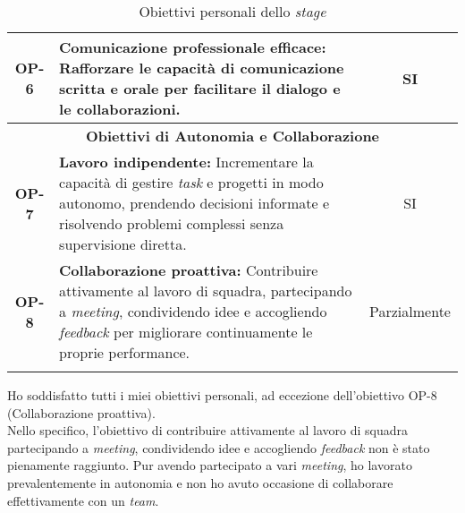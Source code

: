 \begin{longtable}{|c|>{\centering\arraybackslash}p{}|c|}
    \hline
    \textbf{OP-6} & \textbf{Comunicazione professionale efficace:} Rafforzare le capacità di comunicazione scritta e orale per facilitare il dialogo e le collaborazioni.& SI \\
    \hline
    \multicolumn{3}{|c|}{\rowcolor{green!30} \textbf{Obiettivi di Autonomia e Collaborazione}} \\
    \hline
    \textbf{OP-7} & \textbf{Lavoro indipendente:} Incrementare la capacità di gestire \textit{task} e progetti in modo autonomo, prendendo decisioni informate e risolvendo problemi complessi senza supervisione diretta.& SI \\
    \hline
    \textbf{OP-8} & \textbf{Collaborazione proattiva:} Contribuire attivamente al lavoro di squadra, partecipando a \textit{meeting}, condividendo idee e accogliendo \textit{feedback} per migliorare continuamente le proprie performance. & Parzialmente\\
    \hline
    \caption{Obiettivi personali dello \textit{stage}} %
    \label{tab:raggiungimento-obiettivi-personali-stage} %
\end{longtable}


\noindent Ho soddisfatto tutti i miei obiettivi personali, ad eccezione dell'obiettivo OP-8 (Collaborazione proattiva).\\

\noindent Nello specifico, l’obiettivo di contribuire attivamente al lavoro di squadra partecipando a \textit{meeting}, condividendo idee e accogliendo \textit{feedback} non è stato pienamente raggiunto. Pur avendo partecipato a vari \textit{meeting}, ho lavorato prevalentemente in autonomia e non ho avuto occasione di collaborare effettivamente con un \textit{team}.